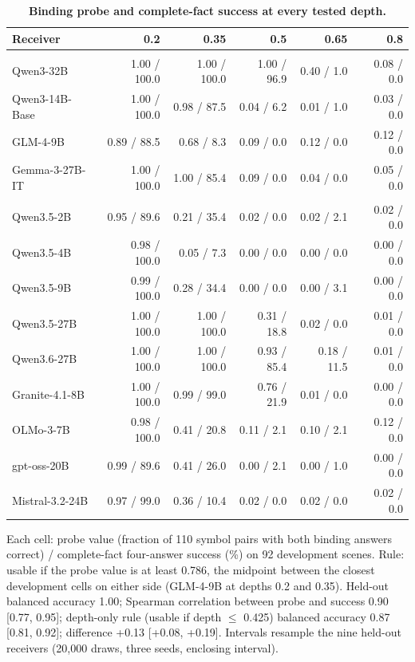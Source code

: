 \begin{table}[!htbp]
\caption{\textbf{Binding probe and complete-fact success at every tested depth.}}
\label{tab:predict_full}
\centering\small
\setlength{\tabcolsep}{3pt}
\begin{tabular*}{\linewidth}{@{\extracolsep{\fill}}lrrrrr@{}}
\toprule
Receiver & 0.2 & 0.35 & 0.5 & 0.65 & 0.8 \\
\midrule
\addlinespace[2pt]\multicolumn{6}{@{}l}{\textit{Development receivers (threshold fitted here)}} \\
Qwen3-32B & 1.00 / 100.0 & 1.00 / 100.0 & 1.00 / 96.9 & 0.40 / 1.0 & 0.08 / 0.0 \\
Qwen3-14B-Base & 1.00 / 100.0 & 0.98 / 87.5 & 0.04 / 6.2 & 0.01 / 1.0 & 0.03 / 0.0 \\
GLM-4-9B & 0.89 / 88.5 & 0.68 / 8.3 & 0.09 / 0.0 & 0.12 / 0.0 & 0.12 / 0.0 \\
Gemma-3-27B-IT & 1.00 / 100.0 & 1.00 / 85.4 & 0.09 / 0.0 & 0.04 / 0.0 & 0.05 / 0.0 \\
\addlinespace[2pt]\multicolumn{6}{@{}l}{\textit{Held-out receivers (predictions committed before these outcomes)}} \\
Qwen3.5-2B & 0.95 / 89.6 & 0.21 / 35.4 & 0.02 / 0.0 & 0.02 / 2.1 & 0.02 / 0.0 \\
Qwen3.5-4B & 0.98 / 100.0 & 0.05 / 7.3 & 0.00 / 0.0 & 0.00 / 0.0 & 0.00 / 0.0 \\
Qwen3.5-9B & 0.99 / 100.0 & 0.28 / 34.4 & 0.00 / 0.0 & 0.00 / 3.1 & 0.00 / 0.0 \\
Qwen3.5-27B & 1.00 / 100.0 & 1.00 / 100.0 & 0.31 / 18.8 & 0.02 / 0.0 & 0.01 / 0.0 \\
Qwen3.6-27B & 1.00 / 100.0 & 1.00 / 100.0 & 0.93 / 85.4 & 0.18 / 11.5 & 0.01 / 0.0 \\
Granite-4.1-8B & 1.00 / 100.0 & 0.99 / 99.0 & 0.76 / 21.9 & 0.01 / 0.0 & 0.00 / 0.0 \\
OLMo-3-7B & 0.98 / 100.0 & 0.41 / 20.8 & 0.11 / 2.1 & 0.10 / 2.1 & 0.12 / 0.0 \\
gpt-oss-20B & 0.99 / 89.6 & 0.41 / 26.0 & 0.00 / 2.1 & 0.00 / 1.0 & 0.00 / 0.0 \\
Mistral-3.2-24B & 0.97 / 99.0 & 0.36 / 10.4 & 0.02 / 0.0 & 0.02 / 0.0 & 0.02 / 0.0 \\
\bottomrule
\end{tabular*}
\par\vspace{3pt}
{\footnotesize\raggedright Each cell: probe value (fraction of 110 symbol pairs with both binding answers correct) / complete-fact four-answer success (\%) on 92 development scenes. Rule: usable if the probe value is at least 0.786, the midpoint between the closest development cells on either side (GLM-4-9B at depths 0.2 and 0.35). Held-out balanced accuracy 1.00; Spearman correlation between probe and success 0.90 [0.77, 0.95]; depth-only rule (usable if depth $\le$ 0.425) balanced accuracy 0.87 [0.81, 0.92]; difference +0.13 [+0.08, +0.19]. Intervals resample the nine held-out receivers (20,000 draws, three seeds, enclosing interval).\par}
\end{table}
